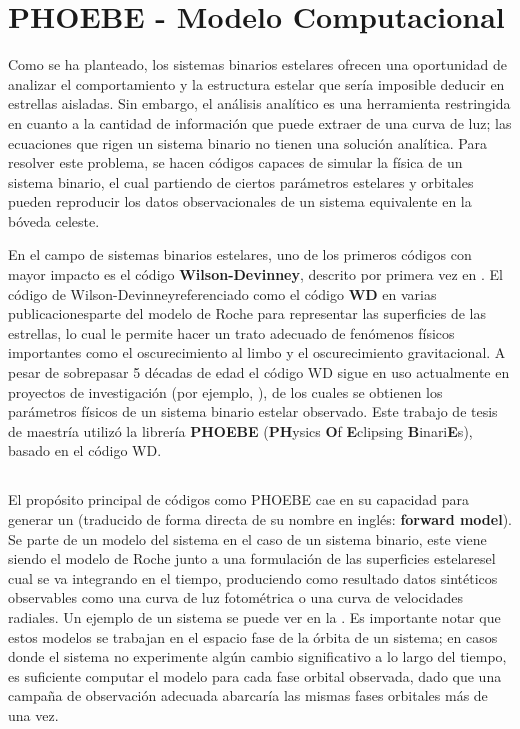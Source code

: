 \chapter{PHOEBE - Modelo Computacional}

Como se ha planteado, los sistemas binarios estelares ofrecen una oportunidad de
analizar el comportamiento y la estructura estelar que sería imposible deducir
en estrellas aisladas. Sin embargo, el análisis analítico es una herramienta
restringida en cuanto a la cantidad de información que puede extraer de una
curva de luz; las ecuaciones que rigen un sistema binario no tienen una solución
analítica. Para resolver este problema, se hacen códigos capaces de simular la
física de un sistema binario, el cual partiendo de ciertos parámetros estelares
y orbitales pueden reproducir los datos observacionales de un sistema
equivalente en la bóveda celeste.

En el campo de sistemas binarios estelares, uno de los primeros códigos con
mayor impacto es el código \textbf{Wilson-Devinney}, descrito por primera vez en
\autocite{wilson_devinney_realization_of_accurate_binary_lcs_wd_1971}. El código
de Wilson-Devinney\textemdash referenciado como el código \textbf{WD} en varias
publicaciones\textemdash parte del modelo de Roche para representar las
superficies de las estrellas, lo cual le permite hacer un trato adecuado de
fenómenos físicos importantes como el oscurecimiento al limbo y el
oscurecimiento gravitacional. A pesar de sobrepasar 5 décadas de edad el código
WD sigue en uso actualmente en proyectos de investigación (por ejemplo,
\autocite{li_extremely_low_mass_ratio_wd_analysis_2022}), de los cuales se
obtienen los parámetros físicos de un sistema binario estelar observado. Este
trabajo de tesis de maestría utilizó la librería \textbf{PHOEBE}
(\textbf{PH}ysics \textbf{O}f \textbf{E}clipsing \textbf{B}inari\textbf{E}s),
basado en el código WD.

\section{}

El propósito principal de códigos como PHOEBE cae en su capacidad para generar
un  (traducido de forma directa de su nombre
en inglés: \textbf{forward model}). Se parte de un modelo del sistema\textemdash
en el caso de un sistema binario, este viene siendo el modelo de Roche junto a
una formulación de las superficies estelares\textemdash el cual se va integrando
en el tiempo, produciendo como resultado datos sintéticos observables como una
curva de luz fotométrica o una curva de velocidades radiales. Un ejemplo de un
sistema  se puede ver en la
. Es importante notar que estos
modelos se trabajan en el espacio fase de la órbita de un sistema; en casos
donde el sistema no experimente algún cambio significativo a lo largo del
tiempo, es suficiente computar el modelo para cada fase orbital observada, dado
que una campaña de observación adecuada abarcaría las mismas fases orbitales más
de una vez.

